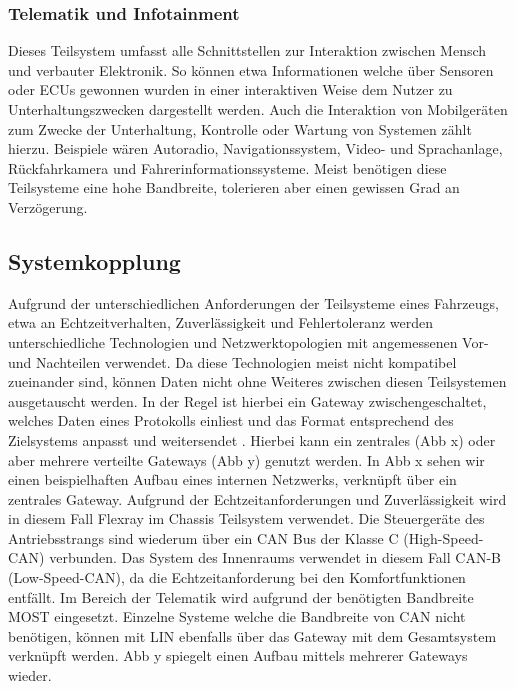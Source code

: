         \subsubsection{Telematik und Infotainment}
        Dieses Teilsystem umfasst alle Schnittstellen zur Interaktion zwischen Mensch und verbauter Elektronik. So können etwa Informationen welche über Sensoren
        oder ECUs gewonnen wurden in einer interaktiven Weise dem Nutzer zu Unterhaltungszwecken dargestellt werden. Auch die Interaktion von Mobilgeräten
        zum Zwecke der Unterhaltung, Kontrolle oder Wartung von Systemen zählt hierzu. Beispiele wären Autoradio, Navigationssystem, Video- und Sprachanlage, Rückfahrkamera und Fahrerinformationssysteme.
        Meist benötigen diese Teilsysteme eine hohe Bandbreite, tolerieren aber einen gewissen Grad an Verzögerung.
    \subsection{Systemkopplung}
    Aufgrund der unterschiedlichen Anforderungen der Teilsysteme eines Fahrzeugs, etwa an Echtzeitverhalten, Zuverlässigkeit und Fehlertoleranz werden unterschiedliche Technologien
    und Netzwerktopologien mit angemessenen Vor- und Nachteilen verwendet. Da diese Technologien meist nicht kompatibel zueinander sind, können Daten nicht ohne Weiteres zwischen diesen
    Teilsystemen ausgetauscht werden. In der Regel ist hierbei ein Gateway zwischengeschaltet, welches Daten eines Protokolls einliest und das Format entsprechend des Zielsystems anpasst
    und weitersendet \cite{Bosch}. Hierbei kann ein zentrales (Abb x) oder aber mehrere verteilte Gateways (Abb y) genutzt werden. 
    In Abb x sehen wir einen beispielhaften Aufbau eines internen Netzwerks, verknüpft über ein zentrales Gateway. Aufgrund der Echtzeitanforderungen und Zuverlässigkeit wird in diesem Fall Flexray
    im Chassis Teilsystem verwendet. Die Steuergeräte des Antriebsstrangs sind wiederum über ein CAN Bus der Klasse C (High-Speed-CAN) verbunden. Das System des Innenraums verwendet in diesem Fall 
    CAN-B (Low-Speed-CAN), da die Echtzeitanforderung bei den Komfortfunktionen entfällt. Im Bereich der Telematik wird aufgrund der benötigten Bandbreite MOST eingesetzt. Einzelne Systeme welche die
    Bandbreite von CAN nicht benötigen, können mit LIN ebenfalls über das Gateway mit dem Gesamtsystem verknüpft werden.
    Abb y spiegelt einen Aufbau mittels mehrerer Gateways wieder.
